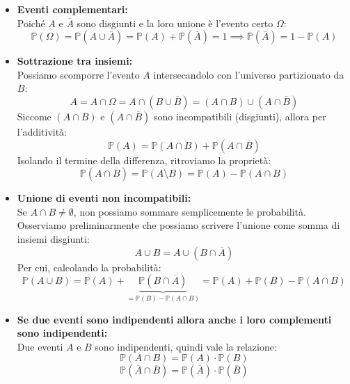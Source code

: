 \begin{itemize}
    \item[$\dagger$] \textbf{Eventi complementari:} \\
    Poiché $A$ e $\overline{A}$ sono disgiunti e la loro unione è l'evento certo $\Omega$:
    \[
    \mathbb{P}(\Omega) = \mathbb{P}(A \cup \overline{A}) = \mathbb{P}(A) + \mathbb{P}(\overline{A}) = 1 \implies \mathbb{P}(\overline{A}) = 1 - \mathbb{P}(A)
    \]

    \item[$\dagger$] \textbf{Sottrazione tra insiemi:} \\
    Possiamo scomporre l'evento $A$ intersecandolo con l'universo partizionato da $B$:
    \[
    A = A \cap \Omega = A \cap (B \cup \overline{B}) = (A \cap B) \cup (A \cap \overline{B})
    \]
    Siccome $(A \cap B)$ e $(A \cap \overline{B})$ sono incompatibili (disgiunti), allora per l'additività:
    \[
    \mathbb{P}(A) = \mathbb{P}(A \cap B) + \mathbb{P}(A \cap \overline{B})
    \]
    Isolando il termine della differenza, ritroviamo la proprietà:
    \[
    \mathbb{P}(A \cap \overline{B}) = \mathbb{P}(A \setminus B) = \mathbb{P}(A) - \mathbb{P}(A \cap B)
    \]

    \item[$\dagger$] \textbf{Unione di eventi non incompatibili:} \\
    Se $A \cap B \neq \emptyset$, non possiamo sommare semplicemente le probabilità. Osserviamo preliminarmente che possiamo scrivere l'unione come somma di insiemi disgiunti:
    \[ A \cup B = A \cup (B \cap \overline{A}) \]
    Per cui, calcolando la probabilità:
    \[
    \mathbb{P}(A \cup B) = \mathbb{P}(A) + \underbrace{\mathbb{P}(B \cap \overline{A})}_{=\mathbb{P}(B)-\mathbb{P}(A \cap B)} = \mathbb{P}(A) + \mathbb{P}(B) - \mathbb{P}(A \cap B)
    \]

    \item[$\dagger$] \textbf{Se due eventi sono indipendenti allora anche i loro complementi sono indipendenti:} \\
    Due eventi $A$ e $B$ sono indipendenti, quindi vale la relazione:
\[ \mathbb{P}(A \cap B) = \mathbb{P}(A) \cdot \mathbb{P}(B) \]
    \[ \mathbb{P}(\overline{A} \cap \overline{B}) = \mathbb{P}(\overline{A}) \cdot \mathbb{P}(\overline{B}) \]
\end{itemize}


